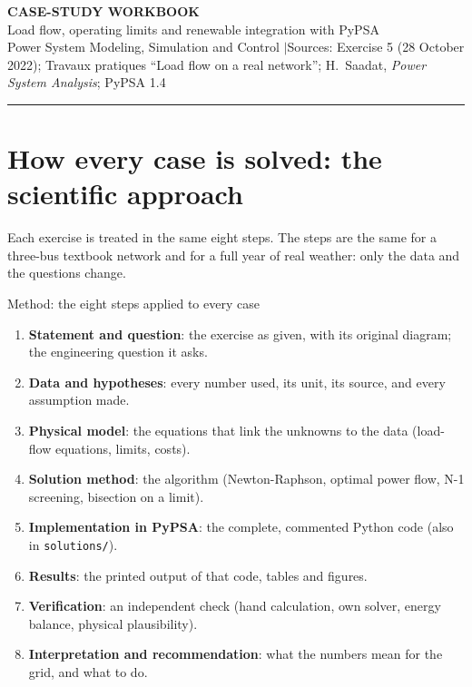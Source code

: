 \documentclass[11pt,a4paper]{article}
\begin{document}
\begin{center}
{\LARGE\bfseries CASE-STUDY WORKBOOK}\\[3pt]
{\Large Load flow, operating limits and renewable integration with PyPSA}\\[6pt]
{\small Power System Modeling, Simulation and Control \quad$|$\quad Sources: Exercise 5 (28 October 2022);
Travaux pratiques ``Load flow on a real network''; H.\ Saadat, \emph{Power System Analysis}; PyPSA 1.4}
\end{center}
\vspace{-4pt}\noindent\rule{\textwidth}{0.6pt}

\section{How every case is solved: the scientific approach}

Each exercise is treated in the same eight steps. The steps are the same for a three-bus
textbook network and for a full year of real weather: only the data and the questions change.

\begin{gbox}{Method: the eight steps applied to every case}
\begin{enumerate}
\item \textbf{Statement and question}: the exercise as given, with its original diagram; the engineering question it asks.
\item \textbf{Data and hypotheses}: every number used, its unit, its source, and every assumption made.
\item \textbf{Physical model}: the equations that link the unknowns to the data (load-flow equations, limits, costs).
\item \textbf{Solution method}: the algorithm (Newton-Raphson, optimal power flow, N-1 screening, bisection on a limit).
\item \textbf{Implementation in PyPSA}: the complete, commented Python code (also in \texttt{solutions/}).
\item \textbf{Results}: the printed output of that code, tables and figures.
\item \textbf{Verification}: an independent check (hand calculation, own solver, energy balance, physical plausibility).
\item \textbf{Interpretation and recommendation}: what the numbers mean for the grid, and what to do.
\end{enumerate}
\end{gbox}
\end{document}
